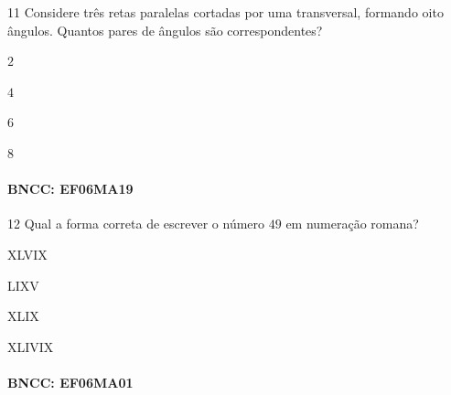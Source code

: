 {\num{11} Considere três retas paralelas cortadas por uma transversal,
formando oito ângulos. Quantos pares de ângulos são correspondentes?

\begin{escolha}
\item $2$
\item $4$
\item $6$
\item $8$
\end{escolha}

\paragraph{BNCC: EF06MA19}


\num{12} Qual a forma correta de escrever o número $49$ em numeração romana?

\begin{escolha}
\item XLVIX
\item LIXV
\item XLIX
\item XLIVIX
\end{escolha}

\paragraph{BNCC: EF06MA01 }

}
